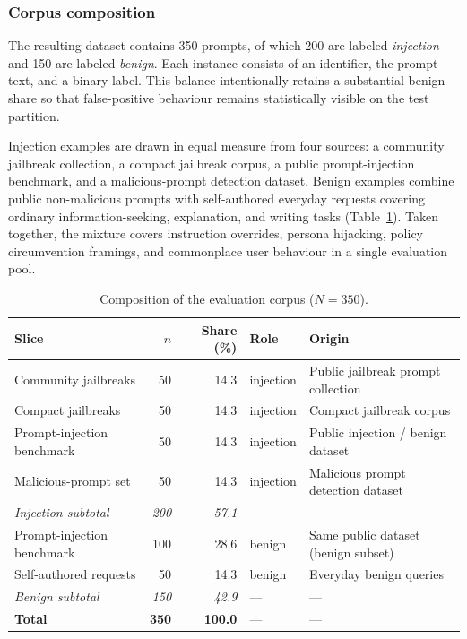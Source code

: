 ﻿\documentclass[10pt]{article}
\begin{document}
\subsubsection{Corpus composition}

The resulting dataset contains 350 prompts, of which 200 are labeled \emph{injection} and 150 are labeled \emph{benign}.
Each instance consists of an identifier, the prompt text, and a binary label.
This balance intentionally retains a substantial benign share so that false-positive behaviour remains statistically visible on the test partition.

Injection examples are drawn in equal measure from four sources: a community jailbreak collection, a compact jailbreak corpus, a public prompt-injection benchmark, and a malicious-prompt detection dataset.
Benign examples combine public non-malicious prompts with self-authored everyday requests covering ordinary information-seeking, explanation, and writing tasks (Table~\ref{tab:data-sources}).
Taken together, the mixture covers instruction overrides, persona hijacking, policy circumvention framings, and commonplace user behaviour in a single evaluation pool.

\begin{table}[t]
  \centering
  \caption{Composition of the evaluation corpus (\(N=350\)).}
  \label{tab:data-sources}
  \begin{tabular}{lrrlp{3.8cm}}
    \hline
    Slice & \(n\) & Share (\%) & Role & Origin \\
    \hline
    Community jailbreaks & 50 & 14.3 & injection & Public jailbreak prompt collection \\
    Compact jailbreaks & 50 & 14.3 & injection & Compact jailbreak corpus \\
    Prompt-injection benchmark & 50 & 14.3 & injection & Public injection / benign dataset \\
    Malicious-prompt set & 50 & 14.3 & injection & Malicious prompt detection dataset \\
    \textit{Injection subtotal} & \textit{200} & \textit{57.1} & --- & --- \\
    \hline
    Prompt-injection benchmark & 100 & 28.6 & benign & Same public dataset (benign subset) \\
    Self-authored requests & 50 & 14.3 & benign & Everyday benign queries \\
    \textit{Benign subtotal} & \textit{150} & \textit{42.9} & --- & --- \\
    \hline
    \textbf{Total} & \textbf{350} & \textbf{100.0} & --- & --- \\
    \hline
  \end{tabular}
\end{table}
\end{document}
